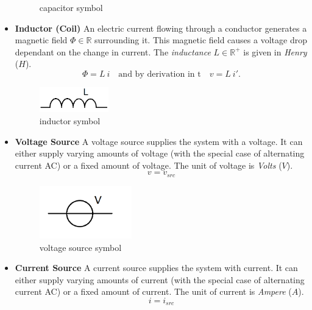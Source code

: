 \begin{itemize}
\begin{figure}[H]
		\caption{capacitor symbol}
	\end{figure}
	\item \textbf{Inductor (Coil)} \newline
	An electric current flowing through a conductor generates a magnetic field $\Phi \in \mathbb{R}$ surrounding it. This magnetic field causes a voltage drop dependant on the change in current. The \emph{inductance} $L \in \mathbb{R}^+$ is given in \emph{Henry} ($H$).
	\begin{displaymath}
		\Phi = L \ i \quad \text{and by derivation in t} \quad v = L \ i'.
	\end{displaymath}
	\begin{figure}[H]
		\label{fig:inductor symbol}
		\centering
		\includegraphics[width=3cm]{pictures/inductance.png}
		\caption{inductor symbol}
	\end{figure}
	\item \textbf{Voltage Source} \newline
	A voltage source supplies the system with a voltage. It can either supply varying amounts of voltage (with the special case of alternating current AC) or a fixed amount of voltage. The unit of voltage is \emph{Volts} ($V$).
	\begin{displaymath}
		v = v_{src}
	\end{displaymath}
	\begin{figure}[H]
		\label{fig:voltage source symbol}
		\centering
		\includegraphics[width=4cm]{pictures/voltage_source.png}
		\caption{voltage source symbol}
	\end{figure}
	\item \textbf{Current Source} \newline
	A current source supplies the system with current. It can either supply varying amounts of current (with the special case of alternating current AC) or a fixed amount of current. The unit of current is \emph{Ampere} ($A$).
	\begin{displaymath}
		i = i_{src}
	\end{displaymath}
	\begin{figure}[H]

\end{figure}
\end{itemize}
